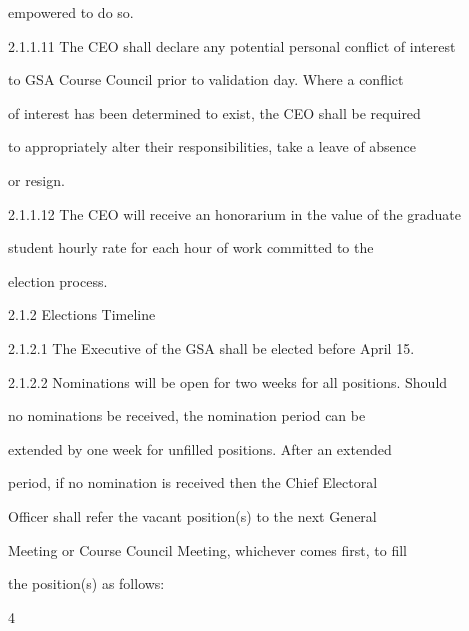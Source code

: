                empowered to do so.   

  

2.1.1.11       The CEO shall declare any potential personal conflict of interest  

               to GSA Course Council prior to validation day. Where a conflict  

               of interest has been determined to exist, the CEO shall be required  

               to appropriately alter their responsibilities, take a leave of absence  

               or resign.   

  

  

2.1.1.12       The CEO will receive an honorarium in the value of the graduate  

               student  hourly  rate  for  each  hour  of  work  committed  to  the  

               election process.  

  

2.1.2  Elections Timeline  

                                 

2.1.2.1        The Executive of the GSA shall be elected before April 15.   

  

2.1.2.2        Nominations will be open for two weeks for all positions. Should  

               no   nominations   be   received,   the   nomination   period   can   be  

               extended  by  one  week  for  unfilled  positions.  After  an  extended  

               period,  if  no  nomination  is  received  then  the  Chief  Electoral  

               Officer  shall  refer  the  vacant  position(s)  to  the  next  General  

               Meeting or Course Council Meeting, whichever comes first, to fill  

               the position(s) as follows:   



                                                       4  

                                                                                                                

